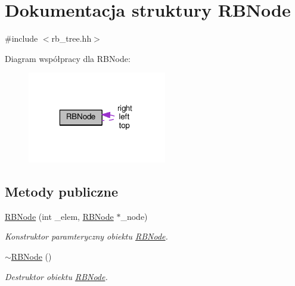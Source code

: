 \hypertarget{struct_r_b_node}{\section{Dokumentacja struktury R\-B\-Node}
\label{struct_r_b_node}
}


{\ttfamily \#include $<$rb\-\_\-tree.\-hh$>$}



Diagram współpracy dla R\-B\-Node\-:
\nopagebreak
\begin{figure}[H]
\begin{center}
\leavevmode
\includegraphics[width=172pt]{struct_r_b_node__coll__graph}
\end{center}
\end{figure}
\subsection*{Metody publiczne}
\begin{DoxyCompactItemize}
\item 
\hyperlink{struct_r_b_node_a47877ed34169ca5d7b4e7ea1ca702fbf}{R\-B\-Node} (int \-\_\-elem, \hyperlink{struct_r_b_node}{R\-B\-Node} $\ast$\-\_\-node)
\begin{DoxyCompactList}\small\item\em Konstruktor paramteryczny obiektu \hyperlink{struct_r_b_node}{R\-B\-Node}. \end{DoxyCompactList}\item 
\hyperlink{struct_r_b_node_aca1bb7761c39ebd05b9051314df10843}{$\sim$\-R\-B\-Node} ()
\begin{DoxyCompactList}\small\item\em Destruktor obiektu \hyperlink{struct_r_b_node}{R\-B\-Node}. \end{DoxyCompactList}\end{DoxyCompactItemize}
